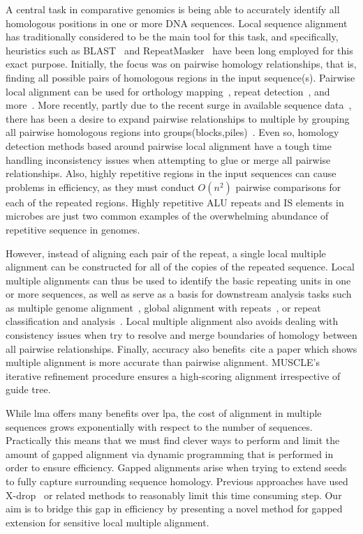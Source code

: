 \documentclass{llncs}
\begin{document}
A central task in comparative genomics is being able to accurately identify all homologous positions in one or more DNA sequences. Local sequence alignment has traditionally considered to be the main tool for this task, and specifically, heuristics such as BLAST~\cite{...} and RepeatMasker~\cite{...} have been long employed for this exact purpose. Initially, the focus was on pairwise homology relationships, that is, finding all possible pairs of homologous regions in the input sequence(s). Pairwise local alignment can be used for orthology mapping~\cite{ref-orthomcl}, repeat detection~\cite{repseek}, and more~\cite{more}. More recently, partly due to the recent surge in available sequence data~\cite{...}, there has been a desire to expand pairwise relationships to multiple by grouping all pairwise homologous regions into groups(blocks,piles)~\cite{...}. Even so, homology detection methods based around pairwise local alignment have a tough time handling inconsistency issues when attempting to glue or merge all pairwise relationships. Also, highly repetitive regions in the input sequences can cause problems in efficiency, as they must conduct $O(n^{2})$ pairwise comparisons for each of the repeated regions. Highly repetitive ALU repeats and IS elements in microbes are just two common examples of the overwhelming abundance of repetitive sequence in genomes. 

However, instead of aligning each pair of the repeat, a single local multiple alignment can be constructed for all of the copies of the repeated sequence. Local multiple alignments can thus be used to identify the basic repeating units in one or more sequences, as well as serve as a basis for downstream analysis tasks such as multiple genome alignment~\cite{ref-mauve,ref-mga,ref-mgcat,ref-deweyReview}, global alignment with repeats~\cite{ref-otherSammethPaper,ref-aba}, or repeat classification and analysis~\cite{ref-piler}. Local multiple alignment also avoids dealing with consistency issues when try to resolve and merge boundaries of homology between all pairwise relationships. Finally, accuracy also benefits~\cite{...}cite a paper which shows multiple alignment is more accurate than pairwise alignment.  MUSCLE's iterative refinement procedure ensures
a high-scoring alignment irrespective of guide tree.

While lma offers many benefits over lpa, the cost of alignment in multiple sequences grows exponentially with respect to the number of sequences. Practically this means that we must find clever ways to perform and limit the amount of gapped alignment via dynamic programming that is performed in order to ensure efficiency. Gapped alignments arise when trying to extend seeds to fully capture surrounding sequence homology. Previous approaches have used X-drop~\cite{...} or related methods to reasonably limit this time consuming step. Our aim is to bridge this gap in efficiency by presenting a novel method for gapped extension for sensitive local multiple alignment.
\end{document}
